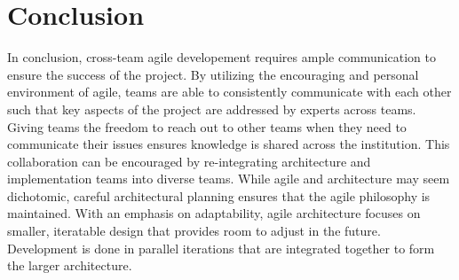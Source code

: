 \section{Conclusion}
In conclusion, cross-team agile developement requires ample communication to ensure the success of the project.
By utilizing the encouraging and personal environment of agile, teams are able to consistently communicate with each other such that key aspects of the project are addressed by experts across teams.
Giving teams the freedom to reach out to other teams when they need to communicate their issues ensures knowledge is shared across the institution.
This collaboration can be encouraged by re-integrating architecture and implementation teams into diverse teams.
While agile and architecture may seem dichotomic, careful architectural planning ensures that the agile philosophy is maintained.
With an emphasis on adaptability, agile architecture focuses on smaller, iteratable design that provides room to adjust in the future.
Development is done in parallel iterations that are integrated together to form the larger architecture.
